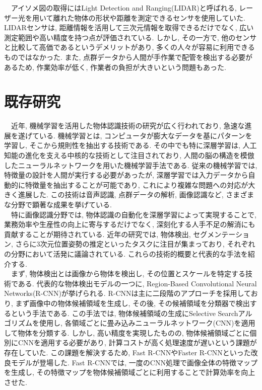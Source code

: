 　アイソメ図の取得にはLight Detection and Ranging(LIDAR)と呼ばれる, レーザー光を用いて離れた物体の形状や距離を測定できるセンサを使用していた. 
LIDARセンサは, 距離情報を活用して三次元情報を取得できるだけでなく, 広い測定範囲や高い精度を持つ点が評価されている. 
しかし, その一方で, 他のセンサと比較して高価であるというデメリットがあり, 多くの人々が容易に利用できるものではなかった. 
また, 点群データから人間が手作業で配管を検出する必要があるため, 作業効率が低く, 作業者の負担が大きいという問題もあった. \\

\section{既存研究}
　近年, 機械学習を活用した物体認識技術の研究が広く行われており, 急速な進展を遂げている. 
機械学習とは, コンピュータが膨大なデータを基にパターンを学習し, そこから規則性を抽出する技術である. 
その中でも特に深層学習は, 人工知能の進化を支える中核的な技術として注目されており, 人間の脳の構造を模倣したニューラルネットワークを用いた機械学習手法である. 
従来の機械学習では, 特徴量の設計を人間が実行する必要があったが, 深層学習では入力データから自動的に特徴量を抽出することが可能であり, これにより複雑な問題への対応が大きく進展した. 
この技術は音声認識, 点群データの解析, 画像認識など, さまざまな分野で顕著な成果を挙げている\cite{bib:7}. \\
　特に画像認識分野では, 物体認識の自動化を深層学習によって実現することで, 業務効率や生産性の向上に寄与するだけでなく, 深刻化する人手不足の解消にも貢献することが期待されている. 
近年の研究では, 物体検出, セグメンテーション, さらに3次元位置姿勢の推定といったタスクに注目が集まっており, それぞれの分野において活発に議論されている. 
これらの技術的概要と代表的な手法を紹介する. \\
　まず, 物体検出とは画像から物体を検出し, その位置とスケールを特定する技術である. 
代表的な物体検出モデルの一つに, Region-Based Convolutional Neural Networks(R-CNN)が挙げられる\cite{bib:8}. 
R-CNNは主に二段階のアプローチを採用しており, まず画像中の物体候補領域を生成し, その後, その候補領域を分類器で検出するという手法である. 
この手法では, 物体候補領域の生成にSelective Searchアルゴリズムを使用し, 各領域ごとに畳み込みニューラルネットワーク(CNN)を適用して物体を分類する. 
しかし, 高い精度を実現したものの, 物体候補領域ごとに個別にCNNを適用する必要があり, 計算コストが高く処理速度が遅いという課題が存在していた. 
この課題を解決するため, Fast R-CNNやFaster R-CNNといった改良モデルが登場した\cite{bib:9}\cite{bib:10}. 
Fast R-CNNでは, 一度のCNN処理で画像全体の特徴マップを生成し, その特徴マップを物体候補領域ごとに利用することで計算効率を向上させた. 

